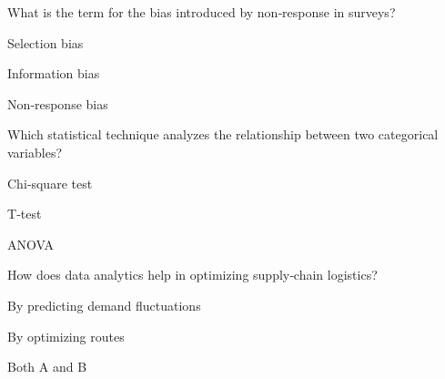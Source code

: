 \begin{enhancedmcq}{What is the term for the bias introduced by non‑response in surveys?}
\item Selection bias
\item Information bias
\item Non‑response bias

\end{enhancedmcq}
\begin{enhancedmcq}{Which statistical technique analyzes the relationship between two categorical variables?}
\item Chi‑square test
\item T‑test
\item ANOVA

\end{enhancedmcq}
\begin{enhancedmcq}{How does data analytics help in optimizing supply‑chain logistics?}
\item By predicting demand fluctuations
\item By optimizing routes
\item Both A and B
\end{enhancedmcq}